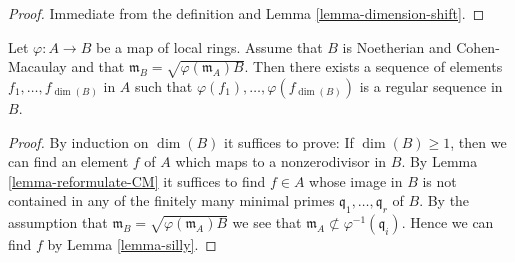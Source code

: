 \begin{proof}
Immediate from the definition and Lemma \ref{lemma-dimension-shift}.
\end{proof}

\begin{lemma}
\label{lemma-find-sequence-image-regular}
Let $\varphi : A \to B$ be a map of local rings.
Assume that $B$ is Noetherian and Cohen-Macaulay and that
$\mathfrak m_B = \sqrt{\varphi(\mathfrak m_A) B}$. Then there exists
a sequence of elements $f_1, \ldots, f_{\dim(B)}$ in $A$
such that $\varphi(f_1), \ldots, \varphi(f_{\dim(B)})$ is a
regular sequence in $B$.
\end{lemma}

\begin{proof}
By induction on $\dim(B)$ it suffices to prove: If $\dim(B) \geq 1$, then we
can find an element $f$ of $A$ which maps to a nonzerodivisor in $B$.
By
Lemma \ref{lemma-reformulate-CM}
it suffices to find $f \in A$ whose image in $B$ is not contained in any
of the finitely many minimal primes $\mathfrak q_1, \ldots, \mathfrak q_r$
of $B$. By the assumption that
$\mathfrak m_B = \sqrt{\varphi(\mathfrak m_A) B}$
we see that $\mathfrak m_A \not \subset \varphi^{-1}(\mathfrak q_i)$.
Hence we can find $f$ by
Lemma \ref{lemma-silly}.
\end{proof}








